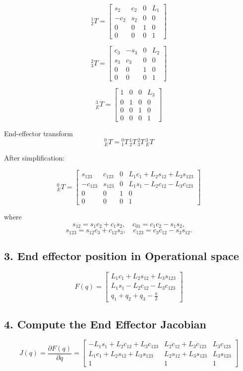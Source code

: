 \documentclass[a4paper,12pt]{article}
\begin{document}
\[
{}^{1}_{2}T=
\begin{bmatrix}
s_2 & c_2 & 0 & L_1 \\
-c_2 & s_2 & 0 & 0 \\
0 & 0 & 1 & 0 \\
0&0&0&1
\end{bmatrix}
\]

\[
{}^{2}_{3}T=
\begin{bmatrix}
c_3 & -s_3 & 0 & L_2 \\
s_3 & c_3 & 0 & 0 \\
0 & 0 &1 &0\\
0&0&0&1
\end{bmatrix}
\]

\[
{}^{3}_{E}T=
\begin{bmatrix}
1&0&0&L_3\\
0&1&0&0\\
0&0&1&0\\
0&0&0&1
\end{bmatrix}
\]

End-effector transform
\[
{}^{0}_{E}T = {}^{0}_{1}T\, {}^{1}_{2}T\, {}^{2}_{3}T\, {}^{3}_{E}T
\]

After simplification:

\[
{}^{0}_{E}T=
\begin{bmatrix}
s_{123} & c_{123} & 0 &
L_1 c_1 + L_2 s_{12} + L_3 s_{123} \\
-c_{123} & s_{123} & 0 &
L_1 s_1- L_2 c_{12} - L_3 c_{123} \\
0 & 0 & 1 & 0 \\
0 & 0 & 0 & 1
\end{bmatrix}
\]

where  
\[
s_{12}=s_1 c_2 + c_1 s_2, \quad
c_{01}=c_1 c_2 - s_1 s_2,
\]
\[
s_{123}= s_{12} c_3 + c_{12}s_3,\quad
c_{123}=c_3 c_{12}-s_3 s_{12}.
\]

\subsection*{3. End effector position in Operational space}
\[
F(q)=
\begin{bmatrix}
L_1 c_1 + L_2 s_{12} + L_3 s_{123} \\
L_1 s_{1} - L_2 c_{12} - L_3 c_{123} \\
q_1 + q_2 + q_3 - \frac{\pi}{2}                                             
\end{bmatrix}
\]

\subsection*{4. Compute the End Effector Jacobian}
\[
J(q)=
\dfrac{\partial F(q)}{\partial q}=
\begin{bmatrix}
-L_1 s_1 + L_2 c_{12} + L_3 c_{123} & L_2 c_{12} + L_3 c_{123} & L_3 c_{123} \\
L_1 c_{1} + L_2 s_{12} + L_3 s_{123} &  L_2 s_{12} + L_3 s_{123} &  L_3 s_{123} \\
1 & 1 &1                                            
\end{bmatrix}
\]
\end{document}
